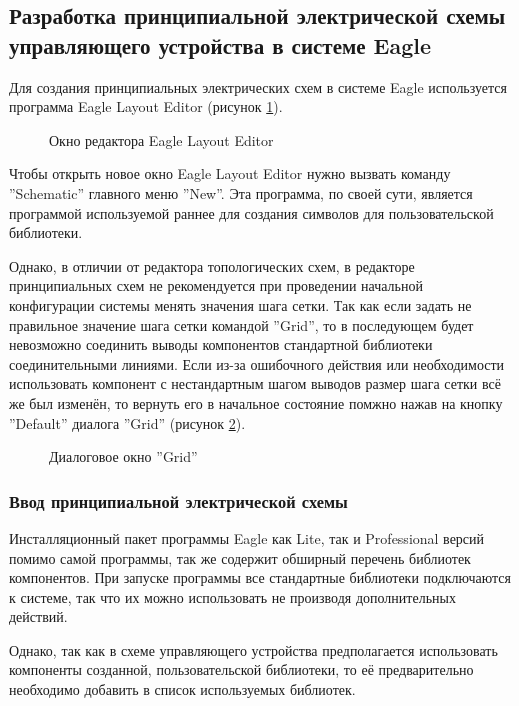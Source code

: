 \subsection{Разработка принципиальной электрической схемы управляющего устройства в системе Eagle}
Для создания принципиальных электрических схем в системе Eagle используется программа
Eagle Layout Editor (рисунок \ref{img:schemeEd}).
\begin{figure}[ht]
	\caption{Окно редактора Eagle Layout Editor}
	\label{img:schemeEd}
\end{figure}

Чтобы открыть новое окно Eagle Layout Editor нужно вызвать команду ''Schematic''
главного меню ''New''. Эта программа, по своей сути, является программой используемой раннее для создания
символов для пользовательской библиотеки.

Однако, в отличии от редактора топологических схем, в редакторе принципиальных схем не рекомендуется при проведении
начальной конфигурации системы менять значения шага сетки. Так как если задать не правильное
значение шага сетки командой ''Grid'', то в последующем будет невозможно соединить выводы
компонентов стандартной библиотеки соединительными линиями. Если из-за ошибочного действия или необходимости
использовать компонент с нестандартным шагом выводов размер шага сетки всё же был изменён, то вернуть его в
начальное состояние помжно нажав на кнопку ''Default'' диалога ''Grid'' (рисунок \ref{img:gridDlg}).
\begin{figure}[ht]
	\caption{Диалоговое окно ''Grid''}
	\label{img:gridDlg}
\end{figure}


\subsubsection{Ввод принципиальной электрической схемы}
Инсталляционный пакет программы Eagle как Lite, так и Professional версий помимо самой программы, так же
содержит обширный перечень библиотек компонентов. При  запуске программы все стандартные библиотеки подключаются
к системе, так что их можно использовать не производя дополнительных действий.


Однако, так как в схеме управляющего устройства предполагается использовать компоненты созданной,
пользовательской библиотеки, то её предварительно необходимо добавить в список используемых библиотек.

